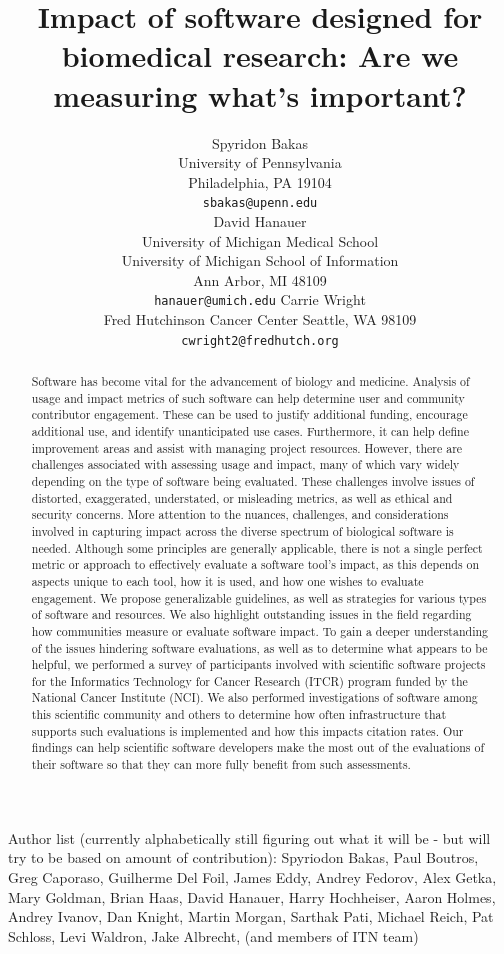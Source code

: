 \documentclass{article}
\title{Impact of software designed for biomedical research: Are we measuring what's important?}
\author{
Spyridon Bakas \\
    University of Pennsylvania \\
    Philadelphia, PA 19104 \\
    \texttt{sbakas@upenn.edu} \\
\AND
David Hanauer \\
    University of Michigan Medical School\\
    University of Michigan School of Information\\
    Ann Arbor, MI 48109\\
    \texttt{hanauer@umich.edu}
\AND
Carrie Wright \\
    Fred Hutchinson Cancer Center
    Seattle, WA 98109 \\
    \texttt{cwright2@fredhutch.org}\\
}
\begin{document}
\maketitle
Author list (currently alphabetically still figuring out what it will be - but will try to be based on amount of contribution):
Spyriodon Bakas, Paul Boutros, Greg Caporaso,  Guilherme Del Foil, James Eddy, Andrey Fedorov, Alex Getka, Mary Goldman, Brian Haas, David Hanauer, Harry Hochheiser, Aaron Holmes, Andrey Ivanov, Dan Knight, Martin Morgan, Sarthak Pati, Michael Reich, Pat Schloss, Levi Waldron, Jake Albrecht, (and members of ITN team)
\begin{abstract}
Software has become vital for the advancement of biology and medicine. Analysis of usage and impact metrics of such software can help determine user and community contributor engagement. These can be used to justify additional funding, encourage additional use, and identify unanticipated use cases. Furthermore, it can help define improvement areas and assist with managing project resources. However, there are challenges associated with assessing usage and impact, many of which vary widely depending on the type of software being evaluated. These challenges involve issues of distorted, exaggerated, understated, or misleading metrics, as well as ethical and security concerns.  More attention to the nuances, challenges, and considerations involved in capturing impact across the diverse spectrum of biological software is needed. Although some principles are generally applicable, there is not a single perfect metric or approach to effectively evaluate a software tool’s impact, as this depends on aspects unique to each tool, how it is used, and how one wishes to evaluate engagement. We propose generalizable guidelines, as well as strategies for various types of software and resources. We also highlight outstanding issues in the field regarding how communities measure or evaluate software impact. To gain a deeper understanding of the issues hindering software evaluations, as well as to determine what appears to be helpful, we performed a survey of participants involved with scientific software projects for the Informatics Technology for Cancer Research (ITCR) program funded by the National Cancer Institute (NCI). We also performed investigations of software among this scientific community and others to determine how often infrastructure that supports such evaluations is implemented and how this impacts citation rates.  Our findings can help scientific software developers make the most out of the evaluations of their software so that they can more fully benefit from such assessments.
\end{abstract}
\end{document}
